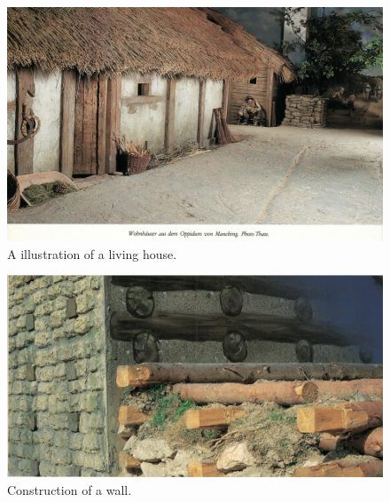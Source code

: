 \begin{figure}[ht]
	\centering
	\includegraphics[width=\linewidth]{pictures/scan_manching_1.png}
	\caption{A illustration of a living house.}
\end{figure}

\begin{figure}[ht]
	\centering
	\includegraphics[width=\linewidth]{pictures/scan_manching_4.png}
	\caption{Construction of a wall.}
\end{figure}


